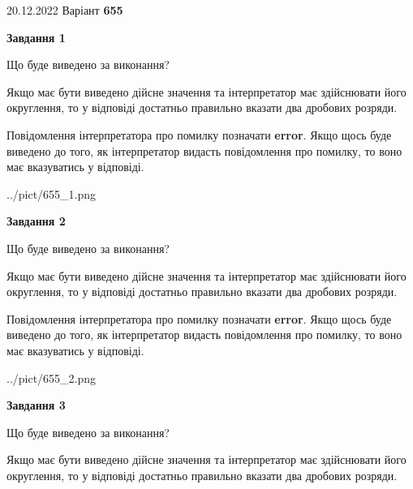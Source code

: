 \documentclass[12pt, ukrainian]{article}
\begin{document}
{20.12.2022 Варіант \No \textbf { 655 }\par}
{
\begin {Large}

{\begin {center}\textbf{Завдання 1}\end {center}}\par
Що буде виведено за виконання? \par

Якщо має бути виведено дійсне значення та інтерпретатор має здійснювати його округлення, 
то у відповіді достатньо правильно вказати два дробових розряди.

Повідомлення інтерпретатора про помилку позначати \textbf{error}.
Якщо щось буде виведено до того, як інтерпретатор видасть повідомлення про помилку, 
то воно має вказуватись у відповіді. \par

\begin{center}
	{../pict/655_1.png}
\end{center}
\newpage

{\begin {center}\textbf{Завдання 2}\end {center}}\par
Що буде виведено за виконання? \par

Якщо має бути виведено дійсне значення та інтерпретатор має здійснювати його округлення, 
то у відповіді достатньо правильно вказати два дробових розряди.

Повідомлення інтерпретатора про помилку позначати \textbf{error}.
Якщо щось буде виведено до того, як інтерпретатор видасть повідомлення про помилку, 
то воно має вказуватись у відповіді. \par

\begin{center}
	{../pict/655_2.png}
\end{center}
\newpage

{\begin {center}\textbf{Завдання 3}\end {center}}\par
Що буде виведено за виконання? \par

Якщо має бути виведено дійсне значення та інтерпретатор має здійснювати його округлення, 
то у відповіді достатньо правильно вказати два дробових розряди.


\end{Large}}
\end{document}
